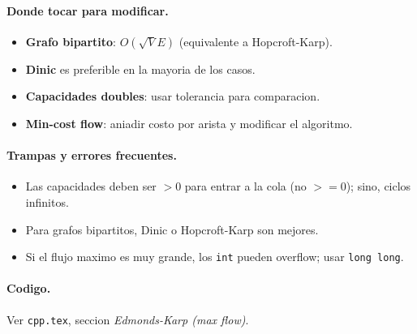 \paragraph{Donde tocar para modificar.}
\begin{itemize}\setlength\itemsep{0pt}
	\item \textbf{Grafo bipartito}: $O(\sqrt{V} E)$ (equivalente a Hopcroft-Karp).
	\item \textbf{Dinic} es preferible en la mayoria de los casos.
	\item \textbf{Capacidades doubles}: usar tolerancia para comparacion.
	\item \textbf{Min-cost flow}: aniadir costo por arista y modificar el algoritmo.
\end{itemize}

\paragraph{Trampas y errores frecuentes.}
\begin{itemize}\setlength\itemsep{0pt}
	\item Las capacidades deben ser $> 0$ para entrar a la cola (no $>= 0$); sino, ciclos infinitos.
	\item Para grafos bipartitos, Dinic o Hopcroft-Karp son mejores.
	\item Si el flujo maximo es muy grande, los \texttt{int} pueden overflow; usar \texttt{long long}.
\end{itemize}

\paragraph{Codigo.}
Ver \texttt{cpp.tex}, seccion \textit{Edmonds-Karp (max flow)}.

\vspace{0.5em}
